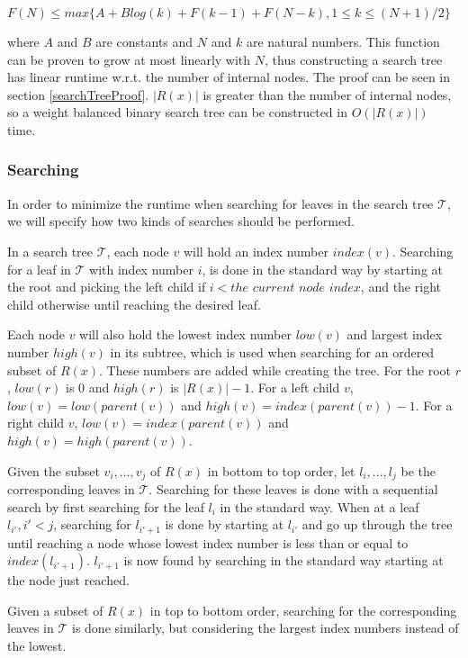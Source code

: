 $F(N) \le max\{A + Blog(k) + F(k-1) + F(N-k), 1 \le k \le (N+1)/2\}$

where $A$ and $B$ are constants and $N$ and $k$ are natural numbers. This function can be proven to grow at most linearly with $N$, thus constructing a search tree has linear runtime w.r.t. the number of internal nodes. The proof can be seen in section \ref{searchTreeProof}. $|R(x)|$ is greater than the number of internal nodes, so a weight balanced binary search tree can be constructed in $O(|R(x)|)$ time.

\subsubsection{Searching}
\label{st_searching}
In order to minimize the runtime when searching for leaves in the search tree $\mathcal{T}$, we will specify how two kinds of searches should be performed.

In a search tree $\mathcal{T}$, each node $v$ will hold an index number $index(v)$. Searching for a leaf in $\mathcal{T}$ with index number $i$, is done in the standard way by starting at the root and picking the left child if $i < the$ $current$ $node$ $index$, and the right child otherwise until reaching the desired leaf.

Each node $v$ will also hold the lowest index number $low(v)$ and largest index number $high(v)$ in its subtree, which is used when searching for an ordered subset of $R(x)$. These numbers are added while creating the tree. For the root $r$, $low(r)$ is 0 and $high(r)$ is $|R(x)|-1$. For a left child $v$, $low(v)=low(parent(v))$ and $high(v)=index(parent(v))-1$. For a right child $v$, $low(v)=index(parent(v))$ and $high(v)=high(parent(v))$.

Given the subset ${v_i, ..., v_j}$ of $R(x)$ in bottom to top order, let ${l_i, ..., l_j}$ be the corresponding leaves in $\mathcal{T}$. Searching for these leaves is done with a sequential search by first searching for the leaf $l_i$ in the standard way. When at a leaf $l_{i'}, i' < j$, searching for $l_{i'+1}$ is done by starting at $l_{i'}$ and go up through the tree until reaching a node whose lowest index number is less than or equal to $index(l_{i'+1})$. $l_{i'+1}$ is now found by searching in the standard way starting at the node just reached.

Given a subset of $R(x)$ in top to bottom order, searching for the corresponding leaves in $\mathcal{T}$ is done similarly, but considering the largest index numbers instead of the lowest.

